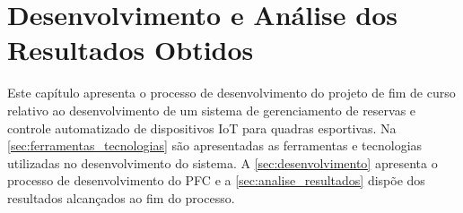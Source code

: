 \chapter{Desenvolvimento e Análise dos Resultados Obtidos}\label{cap:desenvolvimento_e_analise_resultados}
Este capítulo apresenta o processo de desenvolvimento do projeto de fim de curso relativo ao desenvolvimento de um sistema de gerenciamento de reservas e controle automatizado de dispositivos IoT para quadras esportivas. Na \autoref{sec:ferramentas_tecnologias} são apresentadas as ferramentas e tecnologias utilizadas no desenvolvimento do sistema. A \autoref{sec:desenvolvimento} apresenta o processo de desenvolvimento do PFC e a \autoref{sec:analise_resultados} dispõe dos resultados alcançados ao fim do processo.



